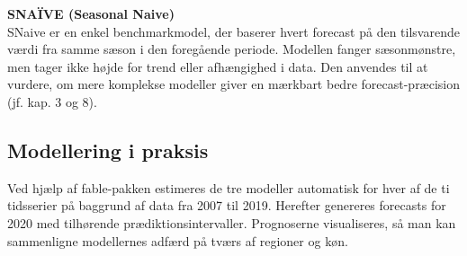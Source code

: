 \documentclass[
]{article}
\begin{document}
\textbf{SNAÏVE (Seasonal Naive)}\\
SNaive er en enkel benchmarkmodel, der baserer hvert forecast på den
tilsvarende værdi fra samme sæson i den foregående periode. Modellen
fanger sæsonmønstre, men tager ikke højde for trend eller afhængighed i
data. Den anvendes til at vurdere, om mere komplekse modeller giver en
mærkbart bedre forecast-præcision (jf. kap. 3 og 8).

\subsection{Modellering i praksis}\label{modellering-i-praksis}

Ved hjælp af fable-pakken estimeres de tre modeller automatisk for hver
af de ti tidsserier på baggrund af data fra 2007 til 2019. Herefter
genereres forecasts for 2020 med tilhørende prædiktionsintervaller.
Prognoserne visualiseres, så man kan sammenligne modellernes adfærd på
tværs af regioner og køn.
\end{document}
